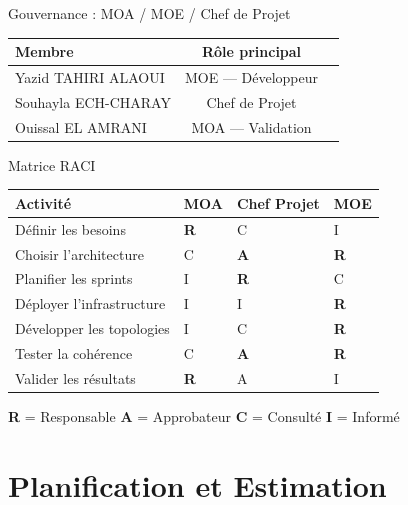 \documentclass[aspectratio=169, 12pt]{beamer}
\begin{document}
\begin{frame}{Gouvernance : MOA / MOE / Chef de Projet}
  \vspace{0.5cm}
  \centering\small
  \begin{tabular}{lcc}
    \toprule
    \textbf{Membre} & \textbf{Rôle principal} \\
    \midrule
    Yazid TAHIRI ALAOUI & MOE — Développeur \\
    Souhayla ECH-CHARAY & Chef de Projet \\
    Ouissal EL AMRANI & MOA — Validation \\
    \bottomrule
  \end{tabular}
\end{frame}

\begin{frame}{Matrice RACI}
  \centering\footnotesize
  \begin{tabular}{L{4cm} C{2cm} C{2cm} C{2cm}}
    \toprule
    \textbf{Activité} & \textbf{MOA} & \textbf{Chef Projet} & \textbf{MOE} \\
    \midrule
    Définir les besoins & \textcolor{kappaBlue}{\textbf{R}} & C & I \\
    Choisir l'architecture & C & \textcolor{kappaGold}{\textbf{A}} & \textcolor{kappaBlue}{\textbf{R}} \\
    Planifier les sprints & I & \textcolor{kappaBlue}{\textbf{R}} & C \\
    Déployer l'infrastructure & I & I & \textcolor{kappaBlue}{\textbf{R}} \\
    Développer les topologies & I & C & \textcolor{kappaBlue}{\textbf{R}} \\
    Tester la cohérence & C & \textcolor{kappaGold}{\textbf{A}} & \textcolor{kappaBlue}{\textbf{R}} \\
    Valider les résultats & \textcolor{kappaBlue}{\textbf{R}} & A & I \\
    \bottomrule
  \end{tabular}
  \vspace{0.4cm}

  \small \textbf{R} = Responsable \quad \textbf{A} = Approbateur \quad \textbf{C} = Consulté \quad \textbf{I} = Informé
\end{frame}

\section{Planification et Estimation}
\end{document}
